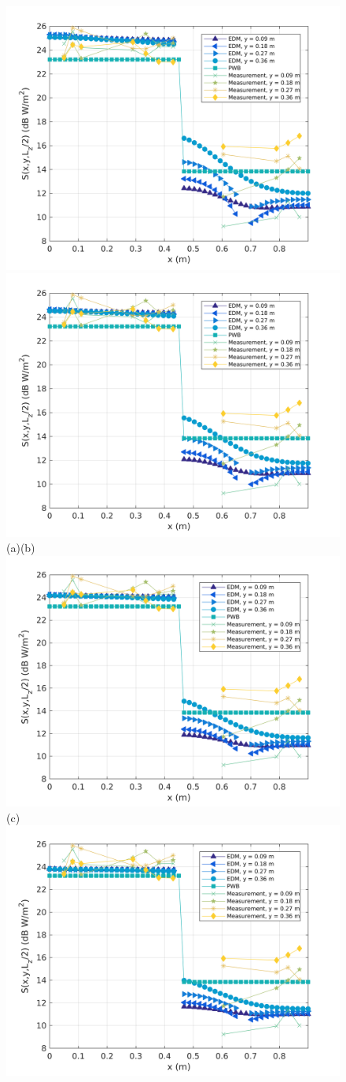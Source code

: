 \documentclass[a4paper]{article}
\numberwithin{equation}{section}
\begin{document}
\begin{figure}[ht]
\begin{center}
\includegraphics[width=0.49\linewidth]{figures/DDM-EEBC_3D_DL_PowerDensityProfileXMeas_JX_k0_5}
\includegraphics[width=0.49\linewidth]{figures/DDM-EEBC_3D_DL_PowerDensityProfileXMeas_JX_k0_75}\\
{\footnotesize (a)\hspace{75mm}(b)}\\
\includegraphics[width=0.5\linewidth]{figures/DDM-EEBC_3D_DL_PowerDensityProfileXMeas_JX_k1_0}\\
{\footnotesize (c)}\\
\includegraphics[width=0.49\linewidth]{figures/DDM-EEBC_3D_DL_PowerDensityProfileXMeas_JX_k1_5}

\end{center}
\end{figure}
\end{document}
